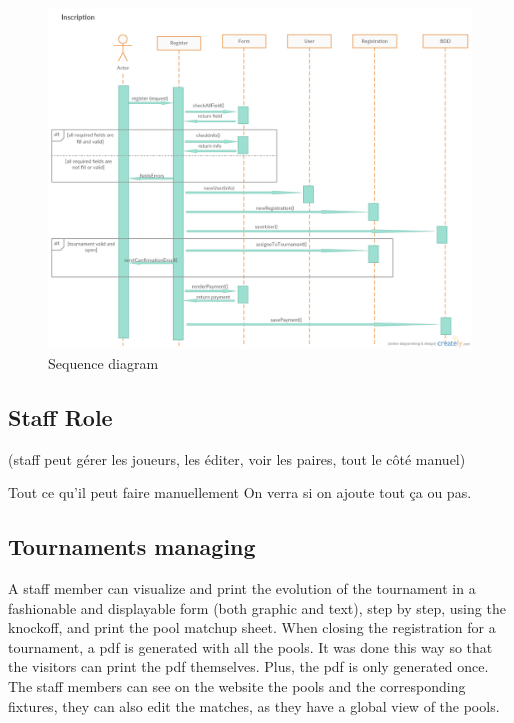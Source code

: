 \documentclass[a4paper, 12pt]{article}
\begin{document}
\begin{figure}

   \caption{\label{playerseq} Sequence diagram}
  \includegraphics[scale=0.4]{Inscription.png}
\end{figure}
\FloatBarrier
\newpage

\subsection*{Staff Role}

(staff peut gérer les joueurs, les éditer, voir les paires, tout le côté manuel)

Tout ce qu'il peut faire manuellement
On verra si on ajoute tout ça ou pas.
\subsection*{Tournaments managing}


A staff member can visualize and print the evolution of the tournament in a fashionable and displayable form (both graphic and text), step by step, using the knockoff, and print the pool matchup sheet. When closing the registration for a tournament, a pdf is generated with all the pools. It was done this way so that the visitors can print the pdf themselves. Plus, the pdf is only generated once. The staff members can see on the website the pools and the corresponding fixtures, they can also edit the matches, as they have a global view of the pools. \\
\end{document}
